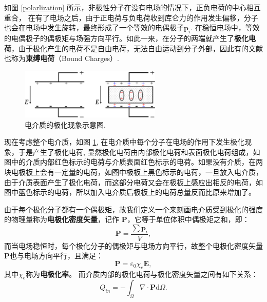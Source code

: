 \documentclass[10pt,reqno, final]{ctexart}
\begin{document}
如图 \ref{polarlization} 所示，非极性分子在没有电场的情况下，正负电荷的中心相互重合， 在有了电场之后，由于正电荷与负电荷收到库仑力的作用发生偏移，分子也会在电场中发生旋转，最终形成了一个等效的电偶极子$\bm{p}_i$. 在稳恒电场中，等效的电偶极子的偶极矩与场强方向平行。如此一来，在分子的两端就产生了\textbf{极化电荷}，由于极化产生的电荷不是自由电荷，无法自由运动到分子外部，因此有的文献也称为\textbf{束缚电荷}（Bound Charges）.
\begin{figure}[htp]
	\centering
	\includegraphics[width=0.6\textwidth]{Figures/jihuashiyan}
	\caption {电介质的极化现象示意图. }
	\label{jihuashiyan}
\end{figure}

现在考虑整个电介质，如图 \ref{jihuashiyan}, 在电介质中每个分子在电场的作用下发生极化现象，于是产生了极化电荷, 显然极化电荷由内部极化电荷和表面极化电荷组成，如图中的介质内部红色标示的电荷与介质表面红色标示的电荷。如果没有介质，在两块电极板上会有一定量的电荷，如图中极板上黑色标示的电荷，一旦放入电介质，由于介质表面产生了极化电荷，而这部分电荷又会在极板上感应出相反的电荷，如图中蓝色标示的电荷，所以加入电介质后极板上的电荷总量反而比原来增加了。

由于每个极化分子都有一个偶极矩，故我们定义一个来刻画电介质受到极化的强度的物理量称为\textbf{电极化密度矢量}，记作 $\bm{P}$，它等于单位体积中偶极矩之和，即：
\begin{equation}
\bm{P} = \frac{\sum {\bm{p}_i}}{V}, 
\end{equation}
而当电场稳恒时，每个极化分子的偶极矩与电场方向平行，故整个电极化密度矢量$\bm{P}$也与电场方向平行，且满足：
\begin{equation}\label{P=kappaE}
\bm{P} = \varepsilon_0\chi_e \bm{E}, 
\end{equation}
其中$\chi_e$称为\textbf{电极化率}。
而介质内部的极化电荷与极化密度矢量之间有如下关系：
\begin{equation}\label{innercontribute}
{Q}_{in} = -\int_{\Omega}\nabla \cdot \bm{P}\mathrm{d}\Omega.
\end{equation}
\end{document}
